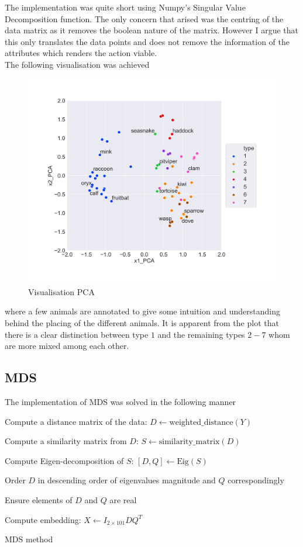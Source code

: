 The implementation was quite short using Numpy's Singular Value Decomposition function. The only concern that arised was the centring of the data matrix as it removes the boolean nature of the matrix. However I argue that this only translates the data points and does not remove the information of the attributes which renders the action viable.
\\

The following visualisation was achieved

\begin{figure}[H]
  \centering
  \includegraphics[width = 0.8\linewidth]{../Visualization_PCA.png}
  \caption{Visualisation PCA}
  \label{vis_PCA}
\end{figure}

where a few animals are annotated to give some intuition and understanding behind the placing of the different animals. It is apparent from the plot that there is a clear distinction between type $1$ and the remaining types $2-7$ whom are more mixed among each other.


\subsection*{MDS}
The implementation of MDS was solved in the following manner

\begin{algorithm}[H]
\SetAlgoLined
{}
  Compute a distance matrix of the data: $D \gets \text{weighted\_distance} (Y) $

  Compute a similarity matrix from $D$: $S \gets \text{similarity\_matrix} (D) $

  Compute Eigen-decomposition of $S$: $[D,Q] \gets \text{Eig}(S)$

  Order $D$ in descending order of eigenvalues magnitude and $Q$ correspondingly

  Ensure elements of $D$ and $Q$ are real

  Compute embedding: $X \gets I_{2\times 101}D Q^T$

  \caption{MDS method}
\end{algorithm}


